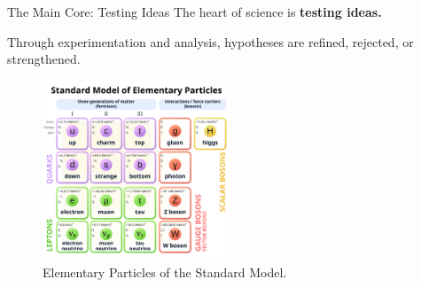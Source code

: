 \begin{frame}{The Main Core: Testing Ideas}
	The heart of science is \textbf{testing ideas.}

	Through experimentation and analysis, hypotheses are refined, rejected, or strengthened.
	\begin{figure}
		\includegraphics[width=0.5\textwidth]{Figures/Standard-Model.png}
		\caption{Elementary Particles of the Standard Model. \cite{Cush2019}}
	\end{figure}

\end{frame}
